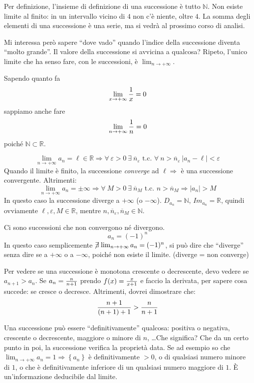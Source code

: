 \documentclass[12pt,a4paper]{article}
\begin{document}
Per definizione, l'insieme di definizione di una successione \`e
tutto $\mathbb{N}$. Non esiste limite al finito: in un intervallo
vicino di $4$ non c'\`e niente, oltre $4$. La somma degli elementi
di una successione \`e una serie, ma si vedr\`a al prossimo corso
di analisi.

Mi interessa per\`o sapere ``dove vado'' quando l'indice della 
successione diventa ``molto grande''. Il valore della successione si
avvicina a qualcosa? Ripeto, l'unico limite che ha senso fare, con le
successioni, \`e $\lim_{n \to +\infty}$. 

Sapendo quanto fa
$$
\lim_{x \to +\infty} {1 \over x} = 0
$$
sappiamo anche fare
$$
\lim_{n \to +\infty} {1 \over n} = 0
$$
poich\'e $\mathbb{N} \subset \mathbb{R}$.

$$
\lim_{n \to +\infty} a_n = \ell \in \mathbb{R} \Rightarrow
\forall \ \varepsilon > 0 \ \exists \ \overline{n}_{\varepsilon} 
\text{ t.c. } \forall \ n > \overline{n}_{\varepsilon} \ | a_n - \ell | 
< \varepsilon
$$
Quando il limite \`e finito, la successione \textit{converge} ad $\ell
\Rightarrow$ \`e una successione convergente. Altrimenti:
$$
\lim_{n \to +\infty} a_n = \pm \infty \Rightarrow \forall \ M > 0
\ \exists \ \overline{n}_M \text{ t.c. } n > \overline{n}_M 
\Rightarrow |a_n| > M
$$
In questo caso la successione diverge a $+\infty$ (o $-\infty$).
$D_{a_n} = \mathbb{N}$, $Im_{a_n} = \mathbb{R}$, quindi ovviamente
$ \ell, \varepsilon, M \in \mathbb{R}$, mentre $n, 
\overline{n}_{\varepsilon}, \overline{n}_M \in \mathbb{N}$.

Ci sono successioni che non convergono n\'e divergono.
$$
a_n = (-1)^n
$$
In questo caso semplicemente $\centernot \exists \lim_{n \to +\infty}
a_n = (-1)^n$, si pu\`o dire che ``diverge'' senza dire se a $+\infty$
o a $-\infty$, poich\'e non esiste il limite. (diverge = non converge)

Per vedere se una successione \`e monotona crescente o decrescente,
devo vedere se $a_{n+1} > a_n$. Se $a_n = {n \over n+1}$ prendo $f(x) =
{x \over x+1}$ e faccio la derivata, per sapere cosa succede: se cresce
o decresce. Altrimenti, dovrei dimostrare che:
$$
{n+1 \over (n+1) +1} > {n \over n+1}
$$

Una successione pu\`o essere ``definitivamente'' qualcosa: positiva o negativa,
crescente o decrescente, maggiore o minore di $n$, \dots Che significa? Che da
un certo punto in poi, la successione verifica la propriet\`a data. Se ad
esempio so che $ \lim_{n \to +\infty} a_n = 1
\Rightarrow {\left\{ a_n \right\}} $ \`e definitivamente $> 0$, o di qualsiasi
numero minore di $1$, o che \`e definitivamente inferiore di un qualsiasi
numero maggiore di $1$. \`E un'informazione deducibile dal limite.
\end{document}
